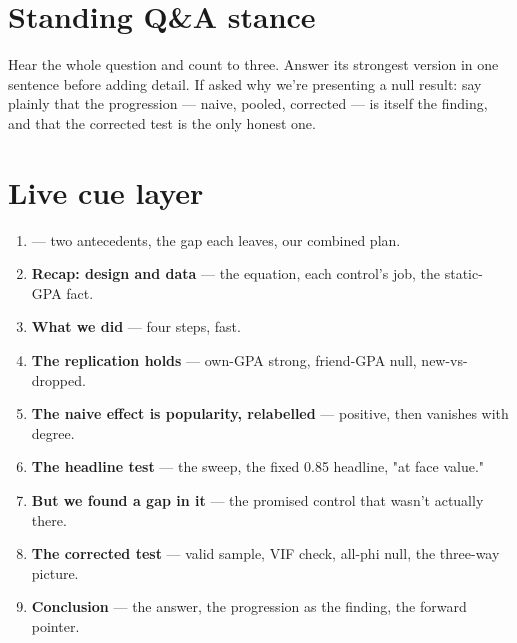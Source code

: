 \documentclass[11pt]{article}
\begin{document}
\section*{Standing Q\&A stance}
Hear the whole question and count to three. Answer its strongest version in
one sentence before adding detail. If asked why we're presenting a null
result: say plainly that the progression --- naive, pooled, corrected --- is
itself the finding, and that the corrected test is the only honest one.

\section*{Live cue layer}
\raggedright\small
\begin{enumerate}\setlength{\itemsep}{0.45em}
  \item \textbf{\KeyQuestion} --- two antecedents, the gap each leaves, our combined plan.
  \item \textbf{Recap: design and data} --- the equation, each control's job, the static-GPA fact.
  \item \textbf{What we did} --- four steps, fast.
  \item \textbf{The replication holds} --- own-GPA strong, friend-GPA null, new-vs-dropped.
  \item \textbf{The naive effect is popularity, relabelled} --- positive, then vanishes with degree.
  \item \textbf{The headline test} --- the sweep, the fixed 0.85 headline, "at face value."
  \item \textbf{But we found a gap in it} --- the promised control that wasn't actually there.
  \item \textbf{The corrected test} --- valid sample, VIF check, all-phi null, the three-way picture.
  \item \textbf{Conclusion} --- the answer, the progression as the finding, the forward pointer.
\end{enumerate}
\end{document}
